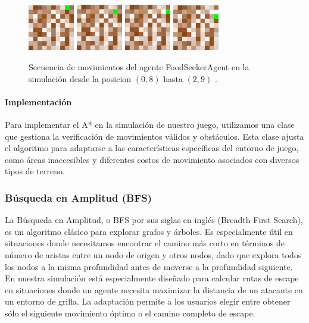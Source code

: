 \documentclass[11pt]{article}
\begin{document}
\begin{figure}[H]
    \centering
    \includegraphics[width=0.18\textwidth]{images/image1.png}\hfill
    \includegraphics[width=0.18\textwidth]{images/image2.png}\hfill
    \includegraphics[width=0.18\textwidth]{images/image3.png}\hfill
    \includegraphics[width=0.18\textwidth]{images/image4.png}
    \caption{Secuencia de movimientos del agente FoodSeekerAgent en la simulación desde la posicion \( (0, 8) \) hasta \( (2, 9) \) .}
\end{figure}

\paragraph{Implementación}
Para implementar el A* en la simulación de nuestro juego, utilizamos una clase que gestiona la verificación de movimientos válidos y obstáculos. Esta clase ajusta el algoritmo para adaptarse a las características específicas del entorno de juego, como áreas inaccesibles y diferentes costos de movimiento asociados con diversos tipos de terreno.

\subsubsection{Búsqueda en Amplitud (BFS)}
La Búsqueda en Amplitud, o BFS por sus siglas en inglés (Breadth-First Search), es un algoritmo clásico para explorar grafos y árboles. Es especialmente útil en situaciones donde necesitamos encontrar el camino más corto en términos de número de aristas entre un nodo de origen y otros nodos, dado que explora todos los nodos a la misma profundidad antes de moverse a la profundidad siguiente.
En nuestra simulación está especialmente diseñado para calcular rutas de escape en situaciones donde un agente necesita maximizar la distancia de un atacante en un entorno de grilla. La adaptación permite a los usuarios elegir entre obtener sólo el siguiente movimiento óptimo o el camino completo de escape.
\end{document}
